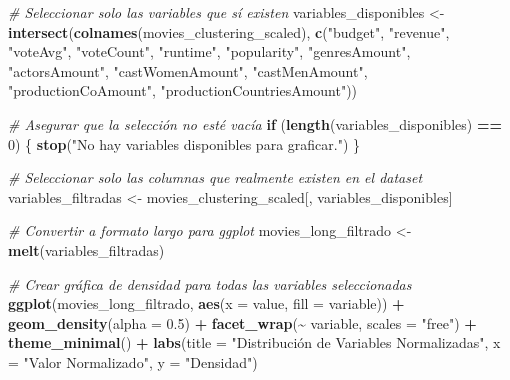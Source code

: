 \documentclass[
]{article}
\newenvironment{Shaded}{\begin{snugshade}}{\end{snugshade}}
\newcommand{\AttributeTok}[1]{\textcolor[rgb]{0.13,0.29,0.53}{#1}}
\newcommand{\CommentTok}[1]{\textcolor[rgb]{0.56,0.35,0.01}{\textit{#1}}}
\newcommand{\ControlFlowTok}[1]{\textcolor[rgb]{0.13,0.29,0.53}{\textbf{#1}}}
\newcommand{\DecValTok}[1]{\textcolor[rgb]{0.00,0.00,0.81}{#1}}
\newcommand{\FloatTok}[1]{\textcolor[rgb]{0.00,0.00,0.81}{#1}}
\newcommand{\FunctionTok}[1]{\textcolor[rgb]{0.13,0.29,0.53}{\textbf{#1}}}
\newcommand{\NormalTok}[1]{#1}
\newcommand{\OtherTok}[1]{\textcolor[rgb]{0.56,0.35,0.01}{#1}}
\newcommand{\SpecialCharTok}[1]{\textcolor[rgb]{0.81,0.36,0.00}{\textbf{#1}}}
\newcommand{\StringTok}[1]{\textcolor[rgb]{0.31,0.60,0.02}{#1}}
\begin{document}
\begin{Shaded}
\begin{Highlighting}[]
\CommentTok{\# Seleccionar solo las variables que sí existen}
\NormalTok{variables\_disponibles }\OtherTok{\textless{}{-}} \FunctionTok{intersect}\NormalTok{(}\FunctionTok{colnames}\NormalTok{(movies\_clustering\_scaled), }
                                   \FunctionTok{c}\NormalTok{(}\StringTok{"budget"}\NormalTok{, }\StringTok{"revenue"}\NormalTok{, }\StringTok{"voteAvg"}\NormalTok{, }\StringTok{"voteCount"}\NormalTok{, }\StringTok{"runtime"}\NormalTok{,}
                                     \StringTok{"popularity"}\NormalTok{, }\StringTok{"genresAmount"}\NormalTok{, }\StringTok{"actorsAmount"}\NormalTok{, }
                                     \StringTok{"castWomenAmount"}\NormalTok{, }\StringTok{"castMenAmount"}\NormalTok{, }\StringTok{"productionCoAmount"}\NormalTok{,}
                                     \StringTok{"productionCountriesAmount"}\NormalTok{))}

\CommentTok{\# Asegurar que la selección no esté vacía}
\ControlFlowTok{if}\NormalTok{ (}\FunctionTok{length}\NormalTok{(variables\_disponibles) }\SpecialCharTok{==} \DecValTok{0}\NormalTok{) \{}
  \FunctionTok{stop}\NormalTok{(}\StringTok{"No hay variables disponibles para graficar."}\NormalTok{)}
\NormalTok{\}}

\CommentTok{\# Seleccionar solo las columnas que realmente existen en el dataset}
\NormalTok{variables\_filtradas }\OtherTok{\textless{}{-}}\NormalTok{ movies\_clustering\_scaled[, variables\_disponibles]}

\CommentTok{\# Convertir a formato largo para ggplot}
\NormalTok{movies\_long\_filtrado }\OtherTok{\textless{}{-}} \FunctionTok{melt}\NormalTok{(variables\_filtradas)}

\CommentTok{\# Crear gráfica de densidad para todas las variables seleccionadas}
\FunctionTok{ggplot}\NormalTok{(movies\_long\_filtrado, }\FunctionTok{aes}\NormalTok{(}\AttributeTok{x =}\NormalTok{ value, }\AttributeTok{fill =}\NormalTok{ variable)) }\SpecialCharTok{+}
  \FunctionTok{geom\_density}\NormalTok{(}\AttributeTok{alpha =} \FloatTok{0.5}\NormalTok{) }\SpecialCharTok{+}
  \FunctionTok{facet\_wrap}\NormalTok{(}\SpecialCharTok{\textasciitilde{}}\NormalTok{ variable, }\AttributeTok{scales =} \StringTok{"free"}\NormalTok{) }\SpecialCharTok{+}
  \FunctionTok{theme\_minimal}\NormalTok{() }\SpecialCharTok{+}
  \FunctionTok{labs}\NormalTok{(}\AttributeTok{title =} \StringTok{"Distribución de Variables Normalizadas"}\NormalTok{,}
       \AttributeTok{x =} \StringTok{"Valor Normalizado"}\NormalTok{,}
       \AttributeTok{y =} \StringTok{"Densidad"}\NormalTok{)}
\end{Highlighting}
\end{Shaded}
\end{document}
